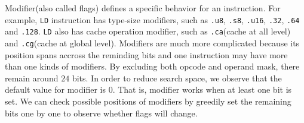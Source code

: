 Modifier(also called flags) defines a specific behavior for an instruction. For example,
{\tt LD} instruction has type-size modifiers, such as {\tt .u8}, {\tt .s8}, {\tt .u16}, {\tt .32}, {\tt .64} and {\tt .128}. {\tt LD} also has cache operation modifier, such as {\tt .ca}(cache at all level) and {\tt .cg}(cache at global level). Modifiers are much more complicated because its position spans accross the reminding bits and one instruction may have more than one kinds of modifiers. By excluding both opcode and operand mask, there remain around $24$ bits. In order to reduce search space, we observe that the default value for modifier is $0$. That is, modifier works when at least one bit is set. We can check possible positions of modifiers by greedily set the remaining bits one by one to observe whether flags will change.
